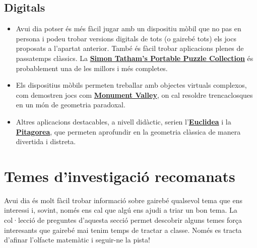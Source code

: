 \documentclass[a4paper, 12pt]{article}
\begin{document}
        \subsection*{Digitals}

            \begin{itemize}
                \item Avui dia potser és més fàcil jugar amb un dispositiu mòbil que no pas en persona i podeu trobar versions digitals de tots (o gairebé tots) els jocs proposats a l'apartat anterior. També és fàcil trobar aplicacions plenes de passatemps clàssics. La \href{https://play.google.com/store/apps/details?id=name.boyle.chris.sgtpuzzles}{\textbf{Simon Tatham's Portable Puzzle Collection}} és probablement una de les millors i més completes.
                \item Els dispositius mòbils permeten treballar amb objectes virtuals complexos, com demostren jocs com \href{https://play.google.com/store/apps/details?id=com.ustwo.monumentvalley}{\textbf{Monument Valley}}, on cal resoldre trencaclosques en un món de geometria paradoxal.
                \item Altres aplicacions destacables, a nivell didàctic, serien l'\href{https://play.google.com/store/apps/details?id=com.hil_hk.euclidea}{\textbf{Euclidea}} i la \href{https://play.google.com/store/apps/details?id=com.hil_hk.pythagorea}{\textbf{Pitagorea}}, que permeten aprofundir en la geometria clàssica de manera divertida i distreta.
            \end{itemize}

    \newpage %

    \section*{Temes d'investigació recomanats}

        Avui dia és molt fàcil trobar informació sobre gairebé qualsevol tema que ens interessi i, sovint, només ens cal que algú ens ajudi a triar un bon tema. La col·lecció de preguntes d'aquesta secció permet descobrir alguns temes força interesants que gairebé mai tenim temps de tractar a classe. Només es tracta d'afinar l'olfacte matemàtic i seguir-ne la pista!
\end{document}
